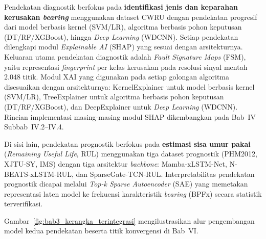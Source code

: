 {\color{blue}Pendekatan diagnostik} berfokus pada \textbf{identifikasi jenis dan keparahan kerusakan
\emph{bearing}} menggunakan dataset CWRU dengan pendekatan progresif dari
model berbasis kernel (SVM/LR), algoritma berbasis pohon keputusan
(DT/RF/XGBoost), hingga \emph{Deep Learning} (WDCNN). Setiap pendekatan
dilengkapi modul \emph{Explainable AI} (SHAP) yang sesuai dengan
arsitekturnya. Keluaran utama {\color{blue}pendekatan diagnostik} adalah
\emph{Fault Signature Maps} (FSM), yaitu representasi \emph{fingerprint}
per kelas kerusakan pada resolusi sinyal mentah 2.048 titik.
{\color{blue}Modul XAI yang digunakan pada setiap golongan algoritma
disesuaikan dengan arsitekturnya: KernelExplainer untuk model berbasis kernel
(SVM/LR), TreeExplainer untuk algoritma berbasis pohon keputusan
(DT/RF/XGBoost), dan DeepExplainer untuk \emph{Deep Learning} (WDCNN).
Rincian implementasi masing-masing modul SHAP dikembangkan pada
Bab~IV Subbab~IV.2--IV.4.}%

Di sisi lain, {\color{blue}pendekatan prognostik} berfokus pada \textbf{estimasi sisa umur pakai}
(\emph{Remaining Useful Life}, RUL) menggunakan tiga dataset prognostik
(PHM2012, XJTU-SY, IMS) dengan tiga arsitektur \emph{backbone}:
Mamba-xLSTM-Net, N-BEATS-xLSTM-RUL, dan SparseGate-TCN-RUL.
Interpretabilitas {\color{blue}pendekatan prognostik} dicapai melalui \emph{Top-k Sparse Autoencoder}
(SAE) yang memetakan representasi laten model ke frekuensi karakteristik
\emph{bearing} (BPFx) secara statistik terverifikasi.

Gambar~\ref{fig:bab3_kerangka_terintegrasi} mengilustrasikan {\color{blue}alur
pengembangan model} kedua pendekatan beserta titik konvergensi di Bab~VI.

